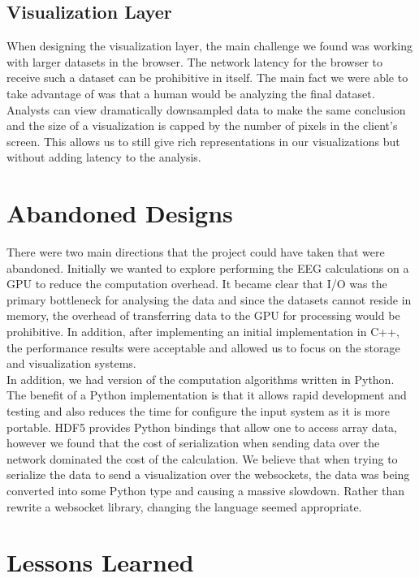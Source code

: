 \subsection{Visualization Layer}

When designing the visualization layer, the main challenge we found was working
with larger datasets in the browser. The network latency for the browser to
receive such a dataset can be prohibitive in itself. The main fact we were able
to take advantage of was that a human would be analyzing the final dataset.
Analysts can view dramatically downsampled data to make the same conclusion and
the size of a visualization is capped by the number of pixels in the client's
screen. This allows us to still give rich representations in our visualizations
but without adding latency to the analysis.

\section{Abandoned Designs}\label{discuss-ch:abandon}

There were two main directions that the project could have taken that were
abandoned. Initially we wanted to explore performing the EEG calculations on a
GPU to reduce the computation overhead. It became clear that I/O was the
primary bottleneck for analysing the data and since the datasets cannot reside
in memory, the overhead of transferring data to the GPU for processing would be
prohibitive. In addition, after implementing an initial implementation in C++,
the performance results were acceptable and allowed us to focus on the storage
and visualization systems. \\

In addition, we had version of the computation algorithms written in Python.
The benefit of a Python implementation is that it allows rapid development and
testing and also reduces the time for configure the input system as it is more
portable. HDF5 provides Python bindings that allow one to access array data,
however we found that the cost of serialization when sending data over the
network dominated the cost of the calculation. We believe that when trying to
serialize the data to send a visualization over the websockets, the data was
being converted into some Python type and causing a massive slowdown. Rather
than rewrite a websocket library, changing the language seemed appropriate.

\section{Lessons Learned}

